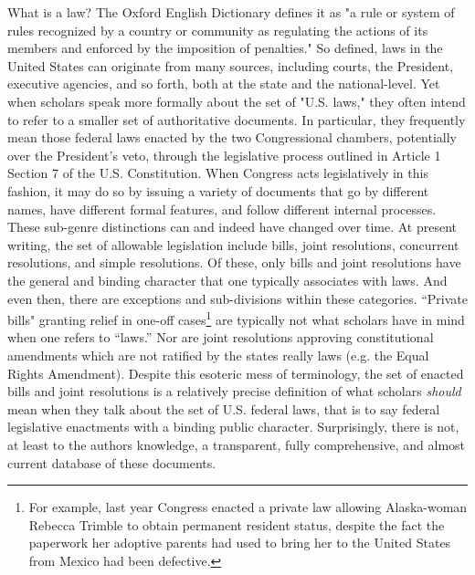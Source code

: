\documentclass[fleqn,10pt]{wlscirep}
\begin{document}
What is a law? The Oxford English Dictionary defines it as "a rule or system of rules recognized by a country or community as regulating the actions of its members and enforced by the imposition of penalties." \cite{law2008} So defined, laws in the United States can originate from many sources, including courts, the President, executive agencies, and so forth, both at the state and the national-level. Yet when scholars speak more formally about the set of "U.S. laws," they often intend to refer to a smaller set of authoritative documents. In particular, they frequently mean those federal laws enacted by the two Congressional chambers, potentially over the President's veto, through the legislative process outlined in Article 1 Section 7 of the U.S. Constitution. When Congress acts legislatively in this fashion, it may do so by issuing a variety of documents that go by different names, have different formal features, and follow different internal processes. These sub-genre distinctions can and indeed have changed over time. At present writing, the set of allowable legislation include bills, joint resolutions, concurrent resolutions, and simple resolutions. Of these, only bills and joint resolutions have the general and binding character that one typically associates with laws. And even then, there are exceptions and sub-divisions within these categories. ``Private bills" granting relief in one-off cases\footnote{For example, last year Congress enacted a private law allowing Alaska-woman Rebecca Trimble to obtain permanent resident status, despite the fact the paperwork her adoptive parents had used to bring her to the United States from Mexico had been defective.} are typically not what scholars have in mind when one refers to ``laws.'' Nor are joint resolutions approving constitutional amendments which are not ratified by the states really laws (e.g. the Equal Rights Amendment). Despite this esoteric mess of terminology, the set of enacted bills and joint resolutions is a relatively precise definition of what scholars \textit{should} mean when they talk about the set of U.S. federal laws, that is to say federal legislative enactments with a binding public character. Surprisingly, there is not, at least to the authors knowledge, a transparent, fully comprehensive, and almost current database of these documents.
\end{document}

